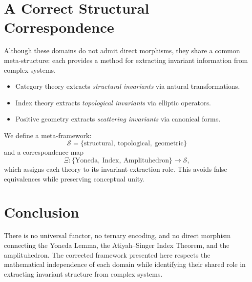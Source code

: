 \documentclass[11pt]{article}
\begin{document}
\section{A Correct Structural Correspondence}
Although these domains do not admit direct morphisms, they share a common
meta-structure: each provides a method for extracting invariant information
from complex systems.

\begin{itemize}
    \item Category theory extracts \emph{structural invariants} via natural
    transformations.
    \item Index theory extracts \emph{topological invariants} via elliptic
    operators.
    \item Positive geometry extracts \emph{scattering invariants} via
    canonical forms.
\end{itemize}

We define a meta-framework:
\[
\mathcal{S} = \{\text{structural},\ \text{topological},\ \text{geometric}\}
\]
and a correspondence map
\[
\Xi : \{\text{Yoneda},\ \text{Index},\ \text{Amplituhedron}\} \to \mathcal{S},
\]
which assigns each theory to its invariant-extraction role. This avoids false
equivalences while preserving conceptual unity.

\section{Conclusion}
There is no universal functor, no ternary encoding, and no direct morphism
connecting the Yoneda Lemma, the Atiyah--Singer Index Theorem, and the
amplituhedron. The corrected framework presented here respects the mathematical
independence of each domain while identifying their shared role in extracting
invariant structure from complex systems.
\end{document}

